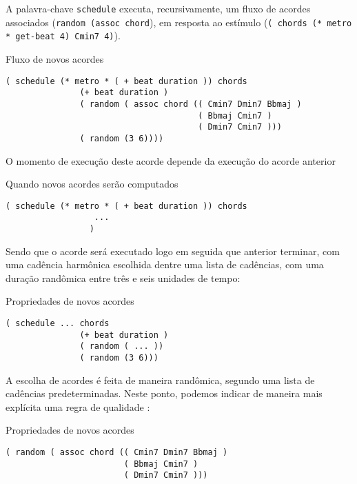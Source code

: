 A palavra-chave \verb|schedule| executa, recursivamente, um fluxo de acordes associados (\verb|random (assoc chord|), em resposta ao estímulo (\verb|( chords (* metro * get-beat 4) Cmin7 4)|). 

\begin{example}{Fluxo de novos acordes}
\begin{verbatim}
( schedule (* metro * ( + beat duration )) chords
               (+ beat duration )
               ( random ( assoc chord (( Cmin7 Dmin7 Bbmaj )
                                       ( Bbmaj Cmin7 )
                                       ( Dmin7 Cmin7 )))
               ( random (3 6))))
\end{verbatim}
\end{example}

O momento de execução deste acorde depende da execução do acorde anterior

\begin{example}{Quando novos acordes serão computados}
\begin{verbatim}
( schedule (* metro * ( + beat duration )) chords
                  ...
                 )
\end{verbatim}
\end{example}

Sendo que o acorde será executado logo em seguida que anterior terminar, com uma cadência harmônica escolhida dentre uma lista de cadências, com uma duração randômica entre três e seis unidades de tempo:

\begin{example}{Propriedades de novos acordes}
\begin{verbatim}
( schedule ... chords
               (+ beat duration )
               ( random ( ... ))
               ( random (3 6)))
\end{verbatim}
\end{example}

A escolha de acordes é feita de maneira randômica, segundo uma lista de cadências predeterminadas. Neste ponto, podemos indicar de maneira mais explícita uma regra de qualidade :

\begin{example}{Propriedades de novos acordes}
\begin{verbatim}
( random ( assoc chord (( Cmin7 Dmin7 Bbmaj )
                        ( Bbmaj Cmin7 )
                        ( Dmin7 Cmin7 )))
\end{verbatim}
\end{example}

